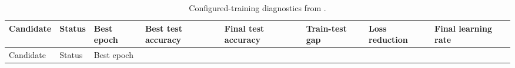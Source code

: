 \documentclass[
]{article}
\begin{document}
\begin{longtable}[]{@{}
  >{\raggedright\arraybackslash}p{}
  >{\raggedright\arraybackslash}p{}
  >{\raggedright\arraybackslash}p{}
  >{\raggedright\arraybackslash}p{}
  >{\raggedright\arraybackslash}p{}
  >{\raggedright\arraybackslash}p{}
  >{\raggedright\arraybackslash}p{}
  >{\raggedright\arraybackslash}p{}@{}}
\caption{Configured-training diagnostics from
\protect{}.}\label{tbl:training-diagnostics}\tabularnewline
\toprule\noalign{}
\begin{minipage}[b]{\linewidth}\raggedright
Candidate
\end{minipage} & \begin{minipage}[b]{\linewidth}\raggedright
Status
\end{minipage} & \begin{minipage}[b]{\linewidth}\raggedright
Best epoch
\end{minipage} & \begin{minipage}[b]{\linewidth}\raggedright
Best test accuracy
\end{minipage} & \begin{minipage}[b]{\linewidth}\raggedright
Final test accuracy
\end{minipage} & \begin{minipage}[b]{\linewidth}\raggedright
Train-test gap
\end{minipage} & \begin{minipage}[b]{\linewidth}\raggedright
Loss reduction
\end{minipage} & \begin{minipage}[b]{\linewidth}\raggedright
Final learning rate
\end{minipage} \\
\midrule\noalign{}
\endfirsthead
\toprule\noalign{}
\begin{minipage}[b]{\linewidth}\raggedright
Candidate
\end{minipage} & \begin{minipage}[b]{\linewidth}\raggedright
Status
\end{minipage} & \begin{minipage}[b]{\linewidth}\raggedright
Best epoch

\end{minipage}
\end{longtable}
\end{document}
